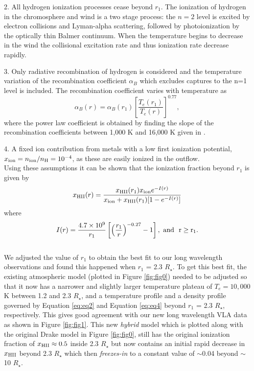 \documentclass[iop]{emulateapj}
\begin{document}
2. All hydrogen ionization processes cease beyond $r_{1}$. The ionization of hydrogen in the chromosphere and wind is a two stage process: the $n = 2$ level is excited by electron collisions and Lyman-alpha scattering, followed by photoionization by the optically thin Balmer continuum. When the temperature begins to decrease in the wind the collisional excitation rate and thus ionization rate decrease rapidly.

3. Only radiative recombination of hydrogen is considered and the temperature variation of the recombination coefficient $\alpha _{B}$ which excludes captures to the n=1 level \citep{1978ppim.book.....S} is included. The recombination coefficient varies with temperature as
\begin{equation}
\alpha _{B}(r) = \alpha _{B}(r_{1})\left[\frac{T_{e}(r_1)}{T_{e}(r)}\right]^{0.77},
\label{eq:eq3}
\end{equation}
where the power law coefficient is obtained by finding the slope of the recombination coefficients between 1,000 K and 16,000 K given in \cite{1978ppim.book.....S}.

4. A fixed ion contribution from metals with a low first ionization potential, $x_{\rm{ion}}=n_{\rm{ion}}/n_{\rm{H}}=10^{-4}$, as these are easily ionized in the outflow.\\
Using these assumptions it can be shown that the ionization fraction beyond $r_{1}$ is given by \citep{1986ApJ...306..605G}
\begin{equation}
x_{\rm{HII}}(r)= \frac{x_{\rm{HII}}(r_1)x_{\rm{ion}}e^{-I(r)}}{x_{\rm{ion}}+x_{\rm{HII}}(r_1)[1 - e^{-I(r)}]}
\label{eq:eq4}
\end{equation}
where
\begin{equation}
I(r) = \frac{4.7\times 10^9}{r_{1}}\left[\left( \frac{r_{1}}{r}\right)^{-0.27} -1 \right], \ \rm{and} \ \  r \geq r_{1}.
\label{eq:eq5}
\end{equation}
\\

We adjusted the value of $r_{1}$ to obtain the best fit to our long wavelength observations and found this happened when $r_{1}$ = 2.3 $R_{\star}$. To get this best fit, the existing atmospheric model (plotted in Figure \ref{fig:fig0}) needed to be adjusted so that it now has a narrower and slightly larger temperature plateau of $T_e = 10,000$ K between 1.2 and 2.3 $R_{\star}$, and a temperature profile and a density profile governed by Equation \ref{eq:eq2} and Equation \ref{eq:eq4} beyond $r_{1}$ = 2.3 $R_{\star}$, respectively. This gives good agreement with our new long wavelength VLA data as shown in Figure \ref{fig:fig1}. This new \textit{hybrid} model which is plotted along with the original Drake model in Figure \ref{fig:fig0}, still has the original ionization fraction of $x_{\rm{HII}} \approx 0.5$ inside 2.3 $R_{\star}$ but now contains an initial rapid decrease in $x_{\rm{HII}}$ beyond 2.3 $R_{\star}$ which then \textit{freezes-in} to a constant value of $\sim$0.04 beyond $\sim$10 $R_{\star}$.
\end{document}
